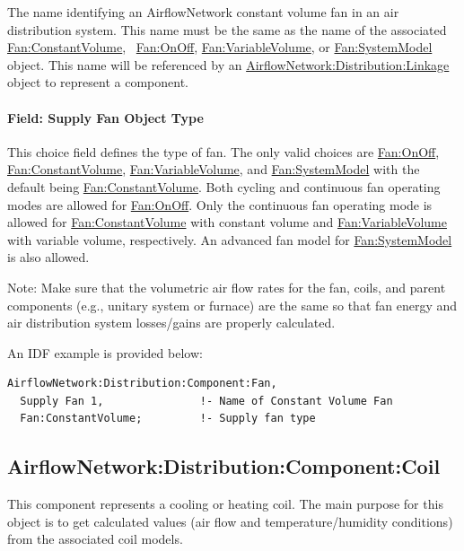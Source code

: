 The name identifying an AirflowNetwork constant volume fan in an air distribution system. This name must be the same as the name of the associated \hyperref[fanconstantvolume]{Fan:ConstantVolume},~ \hyperref[fanonoff]{Fan:OnOff}, \hyperref[fanvariablevolume]{Fan:VariableVolume}, or \hyperref[fansystemmodel]{Fan:SystemModel} object. This name will be referenced by an \hyperref[airflownetworkdistributionlinkage]{AirflowNetwork:Distribution:Linkage} object to represent a component.

\paragraph{Field: Supply Fan Object Type}\label{field-supply-fan-object-type}

This choice field defines the type of fan. The only valid choices are \hyperref[fanonoff]{Fan:OnOff},~ \hyperref[fanconstantvolume]{Fan:ConstantVolume}, \hyperref[fanvariablevolume]{Fan:VariableVolume}, and  \hyperref[fansystemmodel]{Fan:SystemModel} with the default being \hyperref[fanconstantvolume]{Fan:ConstantVolume}. Both cycling and continuous fan operating modes are allowed for \hyperref[fanonoff]{Fan:OnOff}. Only the continuous fan operating mode is allowed for \hyperref[fanconstantvolume]{Fan:ConstantVolume} with constant volume and \hyperref[fanvariablevolume]{Fan:VariableVolume} with variable volume, respectively. An advanced fan model for \hyperref[fansystemmodel]{Fan:SystemModel} is also allowed.

Note: Make sure that the volumetric air flow rates for the fan, coils, and parent components (e.g., unitary system or furnace) are the same so that fan energy and air distribution system losses/gains are properly calculated.

An IDF example is provided below:

\begin{lstlisting}
AirflowNetwork:Distribution:Component:Fan,
  Supply Fan 1,               !- Name of Constant Volume Fan
  Fan:ConstantVolume;         !- Supply fan type
\end{lstlisting}

\subsection{AirflowNetwork:Distribution:Component:Coil}\label{airflownetworkdistributioncomponentcoil}

This component represents a cooling or heating coil. The main purpose for this object is to get calculated values (air flow and temperature/humidity conditions) from the associated coil models.

